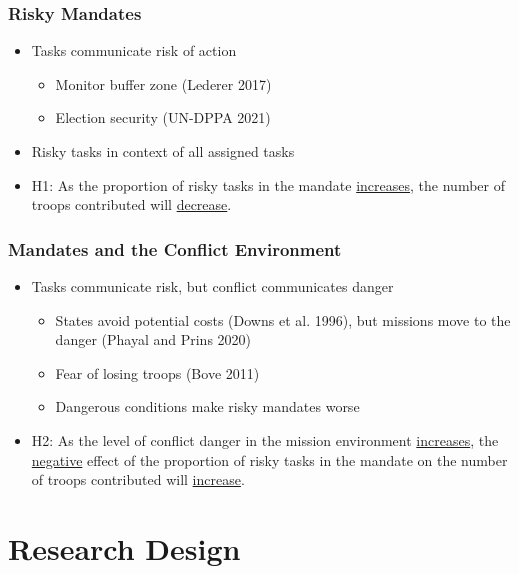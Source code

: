 \documentclass{beamer}
\begin{document}

\begin{frame}
\frametitle{Risky Mandates}

\begin{itemize}
  \pause
  \item Tasks communicate risk of action
  \begin{itemize}
    \pause
    \item Monitor buffer zone {\tiny (Lederer 2017)}
    \item Election security {\tiny (UN-DPPA 2021)}
  \end{itemize}
  \pause
  \item Risky tasks in context of all assigned tasks
  \pause
  \item H1: As the proportion of risky tasks in the mandate \underline{increases}, the number of troops contributed will \underline{decrease}. 
\end{itemize}

\end{frame}


\begin{frame}
\frametitle{Mandates and the Conflict Environment}

\begin{itemize}
  \pause
  \item Tasks communicate risk, but conflict communicates danger
  \begin{itemize}
    \pause
   \item States avoid potential costs {\tiny (Downs et al. 1996)}, but missions move to the danger {\tiny (Phayal and Prins 2020)}
   \item Fear of losing troops {\tiny (Bove 2011)}
   \item Dangerous conditions make risky mandates worse
   \pause
 \end{itemize}
 \item H2: As the level of conflict danger in the mission environment \underline{increases}, the \underline{negative} effect of the proportion of risky tasks in the mandate on the number of troops contributed will \underline{increase}. 
\end{itemize}

\end{frame}

\section{Research Design}
\end{document}
